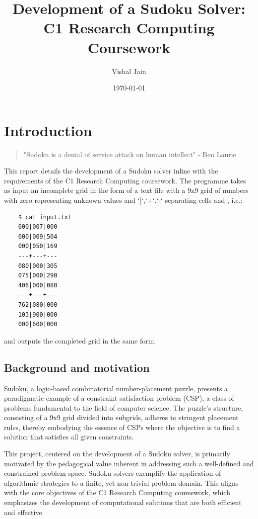 \documentclass[11pt]{article}
\title{Development of a Sudoku Solver: C1 Research Computing Coursework}
\author{Vishal Jain}
\date{\today}
\begin{document}
\maketitle

\tableofcontents

\newpage

\section{Introduction}

\begin{quote}
    "Sudoku is a denial of service attack on human
  intellect" - Ben Laurie
\end{quote}

This report details the development of a Sudoku solver inline with the requirements of the C1 Research Computing coursework. The programme takes as input an incomplete grid in the form of a text file with a 9x9 grid of numbers with zero representing unknown values and `|`,`+`,`-` separating cells and , i.e.:


\begin{verbatim}
    $ cat input.txt
    000|007|000
    000|009|504
    000|050|169
    ---+---+---
    080|000|305
    075|000|290
    406|000|080
    ---+---+---
    762|080|000
    103|900|000
    000|600|000
    \end{verbatim}

and outputs the completed grid in the same form.

\subsection{Background and motivation}

Sudoku, a logic-based combinatorial number-placement puzzle, presents a paradigmatic example of a constraint satisfaction problem (CSP), a class of problems fundamental to the field of computer science. The puzzle's structure, consisting of a 9x9 grid divided into subgrids, adheres to stringent placement rules, thereby embodying the essence of CSPs where the objective is to find a solution that satisfies all given constraints.

This project, centered on the development of a Sudoku solver, is primarily motivated by the pedagogical value inherent in addressing such a well-defined and constrained problem space. Sudoku solvers exemplify the application of algorithmic strategies to a finite, yet non-trivial problem domain. This aligns with the core objectives of the C1 Research Computing coursework, which emphasizes the development of computational solutions that are both efficient and effective.
\end{document}
